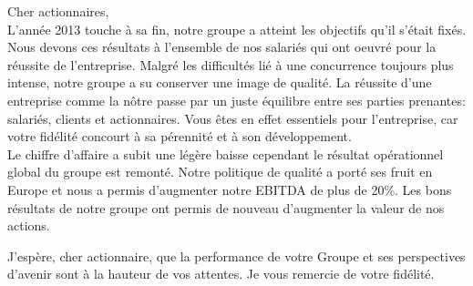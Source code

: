 
Cher actionnaires,\\

	 L'année 2013 touche à sa fin, notre groupe a atteint les objectifs qu'il s'était fixés.
	 Nous devons ces résultats à l'ensemble de nos salariés qui ont oeuvré pour la réussite de l'entreprise.
	 Malgré les difficultés lié à une concurrence toujours plus intense, notre groupe a su conserver une image de qualité.
	 La réussite d'une entreprise comme la nôtre passe par un juste équilibre entre ses parties prenantes: salariés, clients et actionnaires.
	 Vous êtes en effet essentiels pour l’entreprise, car votre fidélité concourt à sa pérennité et à son développement. \\

	 Le chiffre d'affaire a subit une légère baisse cependant le résultat opérationnel global du groupe est remonté.
	 Notre politique de qualité a porté ses fruit en Europe et nous a permis d'augmenter notre EBITDA de plus de 20\%.
	 Les bons résultats de notre groupe ont permis de nouveau d'augmenter la valeur de nos actions.

	 J’espère, cher actionnaire, que la performance de votre Groupe et ses perspectives d’avenir sont à la hauteur de vos attentes.
	 Je vous remercie de votre fidélité.
